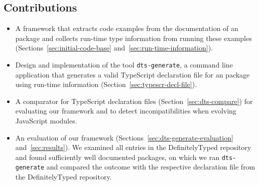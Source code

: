 \documentclass[sigconf]{acmart}
\begin{document}
\subsection{Contributions}
\label{sec:contributions}


\begin{itemize}
\item A framework that extracts code examples from the
  documentation of an \NPM{} package and collects run-time type
  information from running these examples (Sections~\ref{sec:initial-code-base}
  and~\ref{sec:run-time-information}). 

\item Design and implementation of the tool \texttt{dts-generate}, a command line
  application that generates a valid TypeScript declaration file for
  an \NPM{} package using run-time information
  (Section~\ref{sec:typescr-decl-file}). 

\item A comparator for TypeScript declaration files
  (Section~\ref{sec:dts-compare}) for evaluating our framework and to
  detect   incompatibilities when evolving JavaScript modules.
\item An evaluation of our framework (Sections~\ref{sec:dts-generate-evaluation}
  and~\ref{sec:results}). We examined all \CountTotalModulesDefinitelyTyped{} entries in 
  the DefinitelyTyped repository and found \CountModulesGeneratedDeclarationFile{} sufficiently
  well documented \NPM{} packages, on which we ran \texttt{dts-generate}
  and compared the outcome with the respective declaration file from the
  DefinitelyTyped repository. 
\end{itemize}
\end{document}
